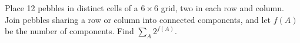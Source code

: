 Place 12 pebbles in distinct cells of a $6\times6$ grid, two in each row and column. Join pebbles sharing a row or column into connected components, and let $f(A)$ be the number of components. Find $\sum_A2^{f(A)}$.

